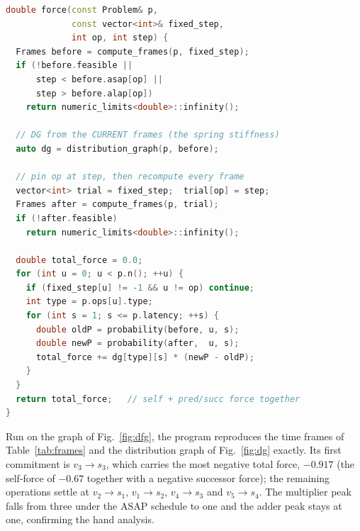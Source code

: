 \documentclass[conference]{IEEEtran}
\begin{document}
\begin{lstlisting}[language=C++,caption={Main feature: total-force evaluation of a candidate pair.},label=lst:force]
double force(const Problem& p,
             const vector<int>& fixed_step,
             int op, int step) {
  Frames before = compute_frames(p, fixed_step);
  if (!before.feasible ||
      step < before.asap[op] ||
      step > before.alap[op])
    return numeric_limits<double>::infinity();

  // DG from the CURRENT frames (the spring stiffness)
  auto dg = distribution_graph(p, before);

  // pin op at step, then recompute every frame
  vector<int> trial = fixed_step;  trial[op] = step;
  Frames after = compute_frames(p, trial);
  if (!after.feasible)
    return numeric_limits<double>::infinity();

  double total_force = 0.0;
  for (int u = 0; u < p.n(); ++u) {
    if (fixed_step[u] != -1 && u != op) continue;
    int type = p.ops[u].type;
    for (int s = 1; s <= p.latency; ++s) {
      double oldP = probability(before, u, s);
      double newP = probability(after,  u, s);
      total_force += dg[type][s] * (newP - oldP);
    }
  }
  return total_force;   // self + pred/succ force together
}
\end{lstlisting}

Run on the graph of Fig.~\ref{fig:dfg}, the program reproduces the time frames
of Table~\ref{tab:frames} and the distribution graph of Fig.~\ref{fig:dg}
exactly. Its first commitment is $v_3\!\to\!s_3$, which carries the most negative
total force, $-0.917$ (the self-force of $-0.67$ together with a negative
successor force); the remaining operations settle at $v_2\!\to\!s_1$,
$v_1\!\to\!s_2$, $v_4\!\to\!s_3$ and $v_5\!\to\!s_4$. The multiplier peak falls
from three under the ASAP schedule to one and the adder peak stays at one,
confirming the hand analysis.
\end{document}
